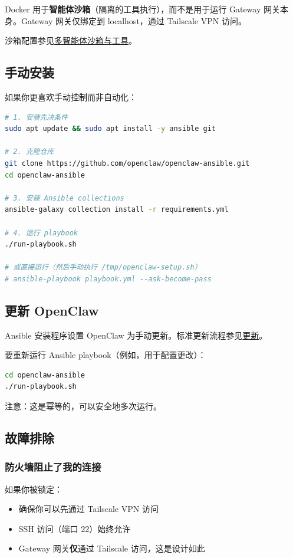 Docker 用于\textbf{智能体沙箱}（隔离的工具执行），而不是用于运行 Gateway 网关本身。Gateway 网关仅绑定到 localhost，通过 Tailscale VPN 访问。

沙箱配置参见\href{/tools/multi-agent-sandbox-tools}{多智能体沙箱与工具}。

\subsection{手动安装}


如果你更喜欢手动控制而非自动化：

\begin{lstlisting}[language=bash]
# 1. 安装先决条件
sudo apt update && sudo apt install -y ansible git

# 2. 克隆仓库
git clone https://github.com/openclaw/openclaw-ansible.git
cd openclaw-ansible

# 3. 安装 Ansible collections
ansible-galaxy collection install -r requirements.yml

# 4. 运行 playbook
./run-playbook.sh

# 或直接运行（然后手动执行 /tmp/openclaw-setup.sh）
# ansible-playbook playbook.yml --ask-become-pass
\end{lstlisting}


\subsection{更新 OpenClaw}


Ansible 安装程序设置 OpenClaw 为手动更新。标准更新流程参见\href{/install/updating}{更新}。

要重新运行 Ansible playbook（例如，用于配置更改）：

\begin{lstlisting}[language=bash]
cd openclaw-ansible
./run-playbook.sh
\end{lstlisting}


注意：这是幂等的，可以安全地多次运行。

\subsection{故障排除}


\subsubsection{防火墙阻止了我的连接}


如果你被锁定：

\begin{itemize}
  \item 确保你可以先通过 Tailscale VPN 访问
  \item SSH 访问（端口 22）始终允许
  \item Gateway 网关\textbf{仅}通过 Tailscale 访问，这是设计如此
\end{itemize}


